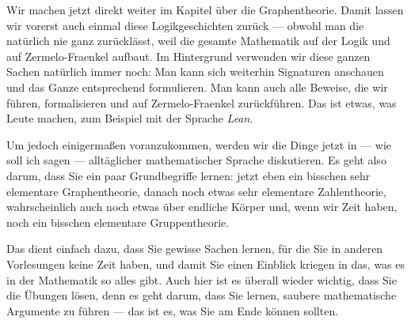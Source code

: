 \begin{spoken-clean}[00:01:25 - 00:03:08]
Wir machen jetzt direkt weiter im Kapitel über die Graphentheorie. Damit lassen wir vorerst auch einmal diese Logikgeschichten zurück --- obwohl man die natürlich nie ganz zurücklässt, weil die gesamte Mathematik auf der Logik und auf Zermelo-Fraenkel aufbaut. Im Hintergrund verwenden wir diese ganzen Sachen natürlich immer noch: Man kann sich weiterhin Signaturen anschauen und das Ganze entsprechend formulieren. Man kann auch alle Beweise, die wir führen, formalisieren und auf Zermelo-Fraenkel zurückführen. Das ist etwas, was Leute machen, zum Beispiel mit der Sprache \emph{Lean}.

Um jedoch einigermaßen voranzukommen, werden wir die Dinge jetzt in --- wie soll ich sagen --- alltäglicher mathematischer Sprache diskutieren. Es geht also darum, dass Sie ein paar Grundbegriffe lernen: jetzt eben ein bisschen sehr elementare Graphentheorie, danach noch etwas sehr elementare Zahlentheorie, wahrscheinlich auch noch etwas über endliche Körper und, wenn wir Zeit haben, noch ein bisschen elementare Gruppentheorie.

Das dient einfach dazu, dass Sie gewisse Sachen lernen, für die Sie in anderen Vorlesungen keine Zeit haben, und damit Sie einen Einblick kriegen in das, was es in der Mathematik so alles gibt. Auch hier ist es überall wieder wichtig, dass Sie die Übungen lösen, denn es geht darum, dass Sie lernen, saubere mathematische Argumente zu führen --- das ist es, was Sie am Ende können sollten.
\end{spoken-clean}

